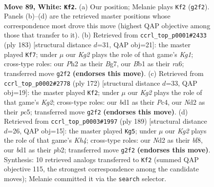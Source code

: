 \documentclass[11pt]{article}
\begin{document}
\clearpage

\begin{figure}[p]\centering
\begin{subfigure}{0.46\textwidth}\centering
\resizebox{\linewidth}{!}{%
\newchessgame
\chessboard[
  setfen={5r2/3k1p2/n5p1/4P2p/5Pp1/8/3N2KP/1B1b4 w - - 36 89},
  showmover=false,
  pgfstyle=straightmove, color=movearrow, markmove={g2-f2}
]}
\caption{}
\end{subfigure}\hfill
\begin{subfigure}{0.46\textwidth}\centering
\resizebox{\linewidth}{!}{%
\newchessgame
\chessboard[
  setfen={6k1/6b1/R5p1/5pPp/1r3P1P/4B3/5PK1/8 b - - 48 92},
  showmover=false,
  pgfstyle=straightmove, color=movearrow, markmove={g8-f7}
]}
\caption{}
\end{subfigure}
\\[4pt]
\begin{subfigure}{0.46\textwidth}\centering
\resizebox{\linewidth}{!}{%
\newchessgame
\chessboard[
  setfen={8/6k1/6p1/2p1pp1p/2P1p2P/6P1/6K1/3B4 w - - 56 87},
  showmover=false,
  pgfstyle=straightmove, color=movearrow, markmove={g2-f2}
]}
\caption{}
\end{subfigure}\hfill
\begin{subfigure}{0.46\textwidth}\centering
\resizebox{\linewidth}{!}{%
\newchessgame
\chessboard[
  setfen={5B2/8/4b3/1p5k/1P3p1p/5P1P/1P4P1/6K1 b - - 61 95},
  showmover=false,
  pgfstyle=straightmove, color=movearrow, markmove={h5-g5}
]}
\caption{}
\end{subfigure}
\caption{\textbf{Move 89, White: \texttt{Kf2}.} (a) Our position; Melanie plays \texttt{Kf2} (\texttt{g2f2}). Panels (b)--(d) are the retrieved master positions whose correspondence most drove this move (highest QAP objective among those that transfer to it). (b) Retrieved from \texttt{ccrl\_top\_p0001\#2433} (ply 183) [structural distance $d$=31, QAP obj=21]: the master played \texttt{Kf7}; under $\mu$ our \emph{Kg2} plays the role of that game's \emph{Kg1}; cross-type roles: our \emph{P}h2 as their \emph{B}g7, our \emph{B}b1 as their \emph{r}a6; transferred move \texttt{g2f2} \textbf{(endorses this move)}. (c) Retrieved from \texttt{ccrl\_top\_p0002\#2778} (ply 172) [structural distance $d$=33, QAP obj=19]: the master played \texttt{Kf2}; under $\mu$ our \emph{Kg2} plays the role of that game's \emph{Kg2}; cross-type roles: our \emph{b}d1 as their \emph{P}c4, our \emph{N}d2 as their \emph{p}c5; transferred move \texttt{g2f2} \textbf{(endorses this move)}. (d) Retrieved from \texttt{ccrl\_top\_p0003\#1997} (ply 189) [structural distance $d$=26, QAP obj=15]: the master played \texttt{Kg5}; under $\mu$ our \emph{Kg2} plays the role of that game's \emph{Kh4}; cross-type roles: our \emph{N}d2 as their \emph{b}f8, our \emph{b}d1 as their \emph{p}b2; transferred move \texttt{g2f2} \textbf{(endorses this move)}. Synthesis: 10 retrieved analogs transferred to \texttt{Kf2} (summed QAP objective 115, the strongest correspondence among the candidate moves); Melanie committed it via the \texttt{search} selector.}
\label{fig:thought-m176}
\end{figure}
\end{document}
